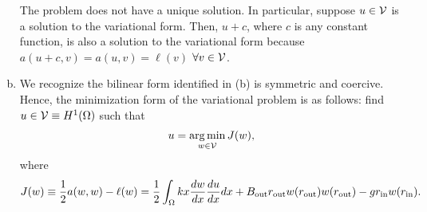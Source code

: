\documentclass[preprint,11pt]{article}
\begin{document}
\begin{enumerate}[(a)]
  The problem does not have a unique solution.  In particular, suppose $u \in \mathcal{V}$ is a solution to the variational form.  Then, $u + c$, where $c$ is any constant function, is also a solution to the variational form because $a(u+c,v) = a(u,v) = \ell(v)$ $\forall v \in \mathcal{V}$.
\item We recognize the bilinear form identified in (b) is symmetric and coercive.  Hence, the minimization form of the variational problem is as follows: find $u \in \mathcal{V} \equiv H^1(\Omega)$ such that
  \begin{align*}
    u = \operatorname*{arg\,min}_{w \in \mathcal{V}} J(w),
  \end{align*}
  where
  \begin{align*}
    J(w) \equiv \frac{1}{2} a(w,w) - \ell(w)
    =
    \frac{1}{2} \int_{\Omega} k x \frac{d w}{d x} \frac{d u}{d x} dx + B_{\rm out} r_{\rm out} w(r_{\rm out})w(r_{\rm out}) 
    -  g r_{\rm in} w(r_{\rm in})   .
  \end{align*}
\end{enumerate}
\end{document}
